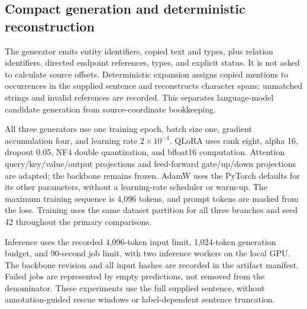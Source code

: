 \documentclass[preprint,12pt]{elsarticle}
\begin{document}
\subsection{Compact generation and deterministic reconstruction}
The generator emits entity identifiers, copied text and types, plus relation
identifiers, directed endpoint references, types, and explicit status. It is
not asked to calculate source offsets. Deterministic expansion assigns copied
mentions to occurrences in the supplied sentence and reconstructs character
spans; unmatched strings and invalid references are recorded. This separates
language-model candidate generation from source-coordinate bookkeeping.

All three generators use one training epoch, batch size one, gradient
accumulation four, and learning rate $2\times10^{-4}$. QLoRA uses rank eight,
alpha 16, dropout 0.05, NF4 double quantization, and bfloat16 computation.
Attention query/key/value/output projections and feed-forward gate/up/down
projections are adapted; the backbone remains frozen. AdamW uses the PyTorch
defaults for its other parameters, without a learning-rate scheduler or
warm-up. The maximum training sequence is 4,096 tokens, and prompt tokens are
masked from the loss. Training uses the same dataset partition for all three
branches and seed 42 throughout the primary comparisons.

Inference uses the recorded 4,096-token input limit, 1,024-token generation
budget, and 90-second job limit, with two inference workers on the local GPU.
The backbone revision and all input hashes are recorded in the artifact
manifest. Failed jobs are represented by empty predictions, not removed from
the denominator. These experiments use the full supplied sentence, without
annotation-guided rescue windows or label-dependent sentence truncation.
\end{document}
